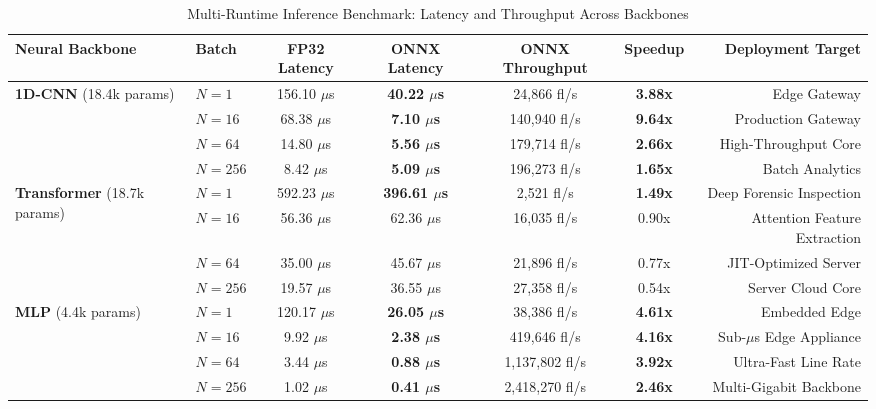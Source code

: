 \documentclass[journal,10pt,twocolumn]{IEEEtran}
\begin{document}
\begin{table}[t]
\caption{Multi-Runtime Inference Benchmark: Latency and Throughput Across Backbones}
\label{tab:onnx_table}
\centering
\footnotesize
\renewcommand{\arraystretch}{1.2}
\begin{tabular*}{\textwidth}{@{\extracolsep{\fill}}llccccr@{}}
\toprule
\textbf{Neural Backbone} & \textbf{Batch} & \textbf{FP32 Latency} & \textbf{ONNX Latency} & \textbf{ONNX Throughput} & \textbf{Speedup} & \textbf{Deployment Target} \\
\midrule
\multirow{4}{*}{\textbf{1D-CNN} (18.4k params)} 
 & $N{=}1$ & 156.10 $\mu$s & \textbf{40.22 $\mu$s} & 24,866 fl/s & \textbf{3.88x} & Edge Gateway \\
 & $N{=}16$ & 68.38 $\mu$s & \textbf{7.10 $\mu$s} & 140,940 fl/s & \textbf{9.64x} & Production Gateway \\
 & $N{=}64$ & 14.80 $\mu$s & \textbf{5.56 $\mu$s} & 179,714 fl/s & \textbf{2.66x} & High-Throughput Core \\
 & $N{=}256$ & 8.42 $\mu$s & \textbf{5.09 $\mu$s} & 196,273 fl/s & \textbf{1.65x} & Batch Analytics \\
\midrule
\multirow{4}{*}{\textbf{Transformer} (18.7k params)} 
 & $N{=}1$ & 592.23 $\mu$s & \textbf{396.61 $\mu$s} & 2,521 fl/s & \textbf{1.49x} & Deep Forensic Inspection \\
 & $N{=}16$ & 56.36 $\mu$s & 62.36 $\mu$s & 16,035 fl/s & 0.90x & Attention Feature Extraction \\
 & $N{=}64$ & 35.00 $\mu$s & 45.67 $\mu$s & 21,896 fl/s & 0.77x & JIT-Optimized Server \\
 & $N{=}256$ & 19.57 $\mu$s & 36.55 $\mu$s & 27,358 fl/s & 0.54x & Server Cloud Core \\
\midrule
\multirow{4}{*}{\textbf{MLP} (4.4k params)} 
 & $N{=}1$ & 120.17 $\mu$s & \textbf{26.05 $\mu$s} & 38,386 fl/s & \textbf{4.61x} & Embedded Edge \\
 & $N{=}16$ & 9.92 $\mu$s & \textbf{2.38 $\mu$s} & 419,646 fl/s & \textbf{4.16x} & Sub-$\mu$s Edge Appliance \\
 & $N{=}64$ & 3.44 $\mu$s & \textbf{0.88 $\mu$s} & 1,137,802 fl/s & \textbf{3.92x} & Ultra-Fast Line Rate \\
 & $N{=}256$ & 1.02 $\mu$s & \textbf{0.41 $\mu$s} & 2,418,270 fl/s & \textbf{2.46x} & Multi-Gigabit Backbone \\
\bottomrule
\end{tabular*}
\end{table}
\end{document}
